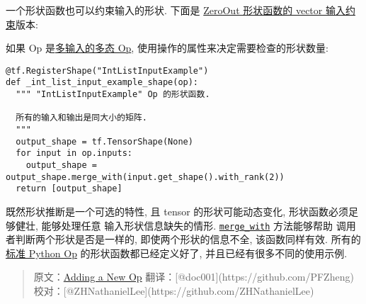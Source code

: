 \begin{Shaded}
\begin{Highlighting}[]
\NormalTok{(}\NormalTok{):}
 

   \NormalTok{[op.inputs[}\NormalTok{].get_shape()]}
\end{Highlighting}
\end{Shaded}

一个形状函数也可以约束输入的形状. 下面是
\protect\hyperlink{Validation}{ZeroOut 形状函数的 vector 输入约束}版本:

\begin{Shaded}
\begin{Highlighting}[]
\NormalTok{(}\NormalTok{):}
 

  \OperatorTok{=} \NormalTok{op.inputs[}\NormalTok{].get_shape().with_rank(}\NormalTok{)}
   
\end{Highlighting}
\end{Shaded}

如果 Op 是\protect\hyperlink{Polymorphism}{多输入的多态 Op},
使用操作的属性来决定需要检查的形状数量:

\begin{verbatim}
@tf.RegisterShape("IntListInputExample")
def _int_list_input_example_shape(op):
  """ "IntListInputExample" Op 的形状函数.

  所有的输入和输出是同大小的矩阵.
  """
  output_shape = tf.TensorShape(None)
  for input in op.inputs:
    output_shape = output_shape.merge_with(input.get_shape().with_rank(2))
  return [output_shape]
\end{verbatim}

既然形状推断是一个可选的特性, 且 tensor 的形状可能动态变化,
形状函数必须足够健壮, 能够处理任意 输入形状信息缺失的情形.
\href{tensorflow-zh/SOURCE/api_docs/python/framework.md}{\texttt{merge\_with}}
方法能够帮助 调用者判断两个形状是否是一样的, 即使两个形状的信息不全,
该函数同样有效.
所有的\href{https://tensorflow.googlesource.com/tensorflow/+/master/tensorflow/python/ops/}{标准
Python Op} 的形状函数都已经定义好了, 并且已经有很多不同的使用示例.

\begin{quote}
原文：\href{http://www.tensorflow.org/how_tos/adding_an_op/index.html\#adding-a-new-op}{Adding
a New Op} 翻译：{[}@doc001{]}(https://github.com/PFZheng)
校对：{[}@ZHNathanielLee{]}(https://github.com/ZHNathanielLee)
\end{quote}


